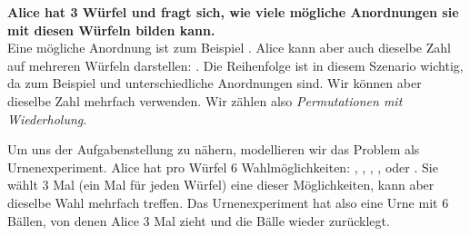 \documentclass[../../main.tex]{subfiles}
\begin{document}
    
    \begin{example}
        \textbf{Alice hat 3 Würfel und fragt sich, wie viele mögliche Anordnungen sie mit diesen Würfeln bilden kann.}\\
        Eine mögliche Anordnung ist zum Beispiel . Alice kann aber auch dieselbe Zahl auf mehreren Würfeln darstellen: . Die Reihenfolge ist in diesem Szenario wichtig, da zum Beispiel  und  unterschiedliche Anordnungen sind. Wir können aber dieselbe Zahl mehrfach verwenden. Wir zählen also \emph{Permutationen mit Wiederholung}.
        
        Um uns der Aufgabenstellung zu nähern, modellieren wir das Problem als Urnenexperiment. Alice hat pro Würfel 6 Wahlmöglichkeiten: , , , ,  oder . Sie wählt 3 Mal (ein Mal für jeden Würfel) eine dieser Möglichkeiten, kann aber dieselbe Wahl mehrfach treffen. Das Urnenexperiment hat also eine Urne mit 6 Bällen, von denen Alice 3 Mal zieht und die Bälle wieder zurücklegt.
        

\end{example}
\end{document}
